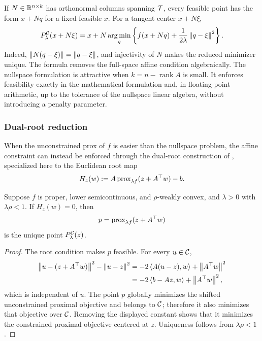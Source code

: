 If \(N\in\mathbb{R}^{n\times k}\) has orthonormal columns spanning \(\mathcal{T}\), every
feasible point has the form \(x+Nq\) for a fixed feasible \(x\).  For a tangent
center \(x+N\xi\),
\begin{equation}
  P_\lambda^{\mathcal{C}}(x+N\xi)
  =
  x+N\operatorname*{arg\,min}_q
  \left\{
    f(x+Nq)+\frac{1}{2\lambda}\left\lVert q-\xi\right\rVert^2
  \right\}.
  \label{eq:nullspace-prox}
\end{equation}
Indeed, \(\left\lVert N(q-\xi)\right\rVert=\left\lVert q-\xi\right\rVert\), and injectivity of \(N\) makes
  the reduced minimizer unique.  The formula removes the full-space affine
  condition algebraically.
The nullspace formulation is attractive when \(k=n-\operatorname{rank}A\)
is small.  It enforces feasibility exactly in the mathematical formulation
and, in floating-point arithmetic, up to the tolerance of the nullspace
linear algebra, without introducing a penalty parameter.

\subsubsection{Dual-root reduction}

When the unconstrained prox of \(f\) is easier than the nullspace problem, the
affine constraint can instead be enforced through the dual-root construction
of \citet[Section~2.1]{HouTangTohWang2026}, specialized here to the Euclidean root map
\begin{equation}
  H_z(w)
  :=
  A\operatorname{prox}_{\lambda f}(z+A^\top w)-b.
  \label{eq:dual-root}
\end{equation}

\begin{proposition}
  \label{prop:dual-recovery}
  Suppose \(f\) is proper, lower semicontinuous, and
  \(\rho\)-weakly convex, and \(\lambda>0\) with \(\lambda\rho<1\).  If \(H_z(w)=0\), then
  \begin{equation}
    p=\operatorname{prox}_{\lambda f}(z+A^\top w)
    \label{eq:dual-recovery}
  \end{equation}
  is the unique point \(P_\lambda^{\mathcal{C}}(z)\).
\end{proposition}

\begin{proof}
  The root condition makes \(p\) feasible.  For every \(u\in\mathcal{C}\),
  \begin{align*}
    \left\lVert u-(z+A^\top w)\right\rVert^{2}-\left\lVert u-z\right\rVert^{2}
    &=
    -2\left\langle A(u-z),w\right\rangle+\left\lVert A^\top w\right\rVert^{2}\\
    &=
    -2\left\langle b-Az,w\right\rangle+\left\lVert A^\top w\right\rVert^{2},
  \end{align*}
  which is independent of \(u\).  The point \(p\) globally minimizes the
  shifted unconstrained proximal objective and belongs to \(\mathcal{C}\);
  therefore it also minimizes that objective over \(\mathcal{C}\).  Removing the
  displayed constant shows that it minimizes the constrained proximal
  objective centered at \(z\).  Uniqueness follows from
  \(\lambda\rho<1\).
\end{proof}

